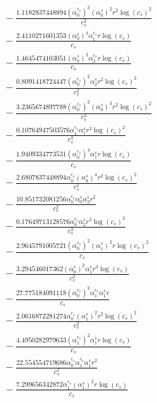 \documentclass[10pt]{article}
\begin{document}
\begin{align*}
&{}  - \frac{1.1182837448894 \left(\alpha_{0}^{c_s}\right)^{3} \left(\alpha_{0}^s\right)^{2} r^{2} \log{\left(c_{s} \right)}^{2}}{c_{s}^{2}} \\
&{}  - \frac{2.4110271601353 \left(\alpha_{0}^s\right)^{4} \alpha_{1}^{c_s} r \log{\left(c_{s} \right)}}{c_{s}} \\
&{}  - \frac{1.4645474103051 \left(\alpha_{0}^s\right)^{2} \alpha_{3}^{c_s} r \log{\left(c_{s} \right)}}{c_{s}} \\
&{}  - \frac{0.8091418724447 \left(\alpha_{0}^{c_s}\right)^{2} \alpha_{2}^s r^{2} \log{\left(c_{s} \right)}^{2}}{c_{s}^{2}} \\
&{}  - \frac{3.2365674897788 \left(\alpha_{0}^{c_s}\right)^{2} \left(\alpha_{0}^s\right)^{3} r^{2} \log{\left(c_{s} \right)}^{2}}{c_{s}^{2}} \\
&{}  - \frac{0.10764947503576 \alpha_{1}^{c_s} \alpha_{1}^s r^{3} \log{\left(c_{s} \right)}^{2}}{c_{s}^{3}} \\
&{}  - \frac{1.9409334773531 \left(\alpha_{0}^{c_s}\right)^{4} \alpha_{1}^s r \log{\left(c_{s} \right)}}{c_{s}} \\
&{}  - \frac{2.6807837448894 \alpha_{0}^{c_s} \left(\alpha_{0}^s\right)^{4} r^{2} \log{\left(c_{s} \right)}^{2}}{c_{s}^{2}} \\
&{}  - \frac{10.851732081256 \alpha_{0}^{c_s} \alpha_{0}^s \alpha_{2}^s r^{2}}{c_{s}^{2}} \\
&{}  - \frac{0.17649713128576 \alpha_{0}^{c_s} \alpha_{2}^s r^{3} \log{\left(c_{s} \right)}^{2}}{c_{s}^{3}} \\
&{}  - \frac{2.9645791005721 \left(\alpha_{0}^{c_s}\right)^{2} \left(\alpha_{1}^s\right)^{2} r \log{\left(c_{s} \right)}^{2}}{c_{s}} \\
&{}  - \frac{3.294546017362 \left(\alpha_{0}^s\right)^{2} \alpha_{1}^s r^{3} \log{\left(c_{s} \right)}}{c_{s}^{3}} \\
&{}  - \frac{27.775184091118 \left(\alpha_{0}^{c_s}\right)^{2} \alpha_{1}^{c_s} \alpha_{1}^s r}{c_{s}} \\
&{}  - \frac{2.0616872281274 \alpha_{0}^{c_s} \left(\alpha_{1}^s\right)^{2} r^{2} \log{\left(c_{s} \right)}^{2}}{c_{s}^{2}} \\
&{}  - \frac{4.4950282979633 \left(\alpha_{1}^{c_s}\right)^{2} \alpha_{1}^s r \log{\left(c_{s} \right)}}{c_{s}} \\
&{}  - \frac{22.554554719686 \alpha_{0}^{c_s} \alpha_{1}^{c_s} \alpha_{1}^s r^{2}}{c_{s}^{2}} \\
&{}  - \frac{7.299656342872 \alpha_{1}^{c_s} \left(\alpha_{1}^s\right)^{2} r \log{\left(c_{s} \right)}}{c_{s}} \\

\end{align*}
\end{document}

